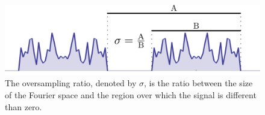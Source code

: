 \begin{figure}[h]
  \centering
  \includegraphics[width=0.8 \columnwidth]{Fourier_Theory/Oversampling.png}
 \caption{The oversampling ratio, denoted by $\sigma$, is the ratio between the
    size of the Fourier space and the region over which the signal is different
    than zero. %
  }
  \label{Fig:OversamplingRatio}

\end{figure}
